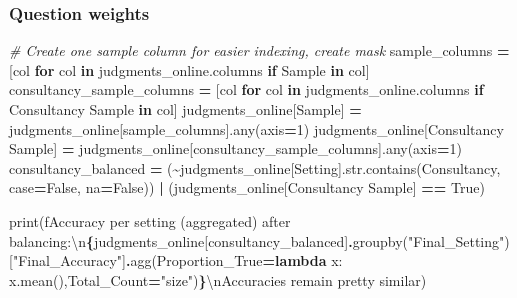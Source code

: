 \documentclass[
]{article}
\newenvironment{Shaded}{\begin{snugshade}}{\end{snugshade}}
\newcommand{\BuiltInTok}[1]{#1}
\newcommand{\CharTok}[1]{\textcolor[rgb]{0.31,0.60,0.02}{#1}}
\newcommand{\CommentTok}[1]{\textcolor[rgb]{0.56,0.35,0.01}{\textit{#1}}}
\newcommand{\ControlFlowTok}[1]{\textcolor[rgb]{0.13,0.29,0.53}{\textbf{#1}}}
\newcommand{\DecValTok}[1]{\textcolor[rgb]{0.00,0.00,0.81}{#1}}
\newcommand{\KeywordTok}[1]{\textcolor[rgb]{0.13,0.29,0.53}{\textbf{#1}}}
\newcommand{\NormalTok}[1]{#1}
\newcommand{\OperatorTok}[1]{\textcolor[rgb]{0.81,0.36,0.00}{\textbf{#1}}}
\newcommand{\SpecialCharTok}[1]{\textcolor[rgb]{0.81,0.36,0.00}{\textbf{#1}}}
\newcommand{\SpecialStringTok}[1]{\textcolor[rgb]{0.31,0.60,0.02}{#1}}
\newcommand{\StringTok}[1]{\textcolor[rgb]{0.31,0.60,0.02}{#1}}
\newcommand{\VariableTok}[1]{\textcolor[rgb]{0.00,0.00,0.00}{#1}}
\begin{document}
\subsubsection{Question weights}\label{question-weights}

\begin{Shaded}
\begin{Highlighting}[]
\CommentTok{\# Create one sample column for easier indexing, create mask}
\NormalTok{sample\_columns }\OperatorTok{=}\NormalTok{ [col }\ControlFlowTok{for}\NormalTok{ col }\KeywordTok{in}\NormalTok{ judgments\_online.columns }\ControlFlowTok{if} \StringTok{\textquotesingle{}Sample\textquotesingle{}} \KeywordTok{in}\NormalTok{ col]}
\NormalTok{consultancy\_sample\_columns }\OperatorTok{=}\NormalTok{ [col }\ControlFlowTok{for}\NormalTok{ col }\KeywordTok{in}\NormalTok{ judgments\_online.columns }\ControlFlowTok{if} \StringTok{\textquotesingle{}Consultancy Sample\textquotesingle{}} \KeywordTok{in}\NormalTok{ col]}
\NormalTok{judgments\_online[}\StringTok{\textquotesingle{}Sample\textquotesingle{}}\NormalTok{] }\OperatorTok{=}\NormalTok{ judgments\_online[sample\_columns].}\BuiltInTok{any}\NormalTok{(axis}\OperatorTok{=}\DecValTok{1}\NormalTok{)}
\NormalTok{judgments\_online[}\StringTok{\textquotesingle{}Consultancy Sample\textquotesingle{}}\NormalTok{] }\OperatorTok{=}\NormalTok{ judgments\_online[consultancy\_sample\_columns].}\BuiltInTok{any}\NormalTok{(axis}\OperatorTok{=}\DecValTok{1}\NormalTok{)}
\NormalTok{consultancy\_balanced }\OperatorTok{=}\NormalTok{ (}\OperatorTok{\textasciitilde{}}\NormalTok{judgments\_online[}\StringTok{\textquotesingle{}Setting\textquotesingle{}}\NormalTok{].}\BuiltInTok{str}\NormalTok{.contains(}\StringTok{\textquotesingle{}Consultancy\textquotesingle{}}\NormalTok{, case}\OperatorTok{=}\VariableTok{False}\NormalTok{, na}\OperatorTok{=}\VariableTok{False}\NormalTok{)) }\OperatorTok{|}\NormalTok{ (judgments\_online[}\StringTok{\textquotesingle{}Consultancy Sample\textquotesingle{}}\NormalTok{] }\OperatorTok{==} \VariableTok{True}\NormalTok{)}

\BuiltInTok{print}\NormalTok{(}\SpecialStringTok{f\textquotesingle{}Accuracy per setting (aggregated) after balancing:}\CharTok{\textbackslash{}n}\SpecialCharTok{\{}\NormalTok{judgments\_online[consultancy\_balanced]}\SpecialCharTok{.}\NormalTok{groupby(}\StringTok{"Final\_Setting"}\NormalTok{)[}\StringTok{"Final\_Accuracy"}\NormalTok{]}\SpecialCharTok{.}\NormalTok{agg(Proportion\_True}\OperatorTok{=}\KeywordTok{lambda}\NormalTok{ x: x.mean(),Total\_Count}\OperatorTok{=}\StringTok{"size"}\NormalTok{)}\SpecialCharTok{\}}\CharTok{\textbackslash{}n}\SpecialStringTok{Accuracies remain pretty similar\textquotesingle{}}\NormalTok{)}
\end{Highlighting}
\end{Shaded}
\end{document}
